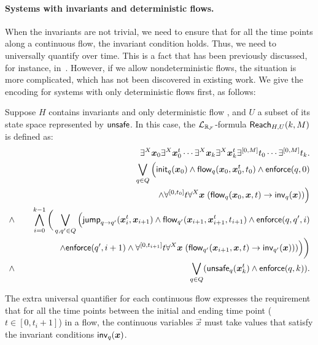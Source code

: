 \documentclass[10pt,envcountsect]{llncs}
\newcommand{\enforce}{\mathsf{enforce}}
\begin{document}
\paragraph{Systems with invariants and deterministic flows.} When the invariants are not trivial, we need to ensure that for all the time points along a continuous flow, the invariant condition holds. Thus, we need to universally quantify over time. This is a fact that has been previously discussed, for instance, in~\cite{DBLP:conf/fmcad/CimattiMT12}. However, if we allow nondeterministic flows, the situation is more complicated, which has not been discovered in existing work. We give the encoding for systems with only deterministic flows first, as follows:
\begin{definition}\label{br2}
Suppose $H$ contains invariants and only deterministic flow
, and $U$ a subset of its state space represented by $\mathsf{unsafe}$. In this case, the $\mathcal{L}_{\mathbb{R}_{\mathcal{F}}}$-formula $\mathsf{Reach}_{H,U}(k,M)$ is defined as:
\begin{eqnarray*}
& &\exists^X \vec x_{0} \exists^X\vec x_{0}^t\cdots \exists^X \vec x_{k}\exists^X\vec x_{k}^t \exists^{[0,M]}t_0\cdots \exists^{[0,M]}t_k.\\
& &\bigvee_{q\in Q} \Big(\init_{q}(\vec x_{0})\wedge \flow_{q}(\vec x_{0}, \vec x_{0}^t, t_0)\wedge \enforce(q,0)\\
& &\hspace{5cm} \wedge \forall^{[0,t_0]}t\forall^X\vec x\;(\flow_{q}(\vec x_{0}, \vec x, t)\rightarrow \inv_{q}(\vec x))\Big) \\
\wedge & &\bigwedge_{i=0}^{k-1}\bigg( \bigvee_{q, q'\in Q} \Big(\jump_{q\rightarrow q'}(\vec
x_{i}^t, \vec x_{i+1})\wedge \flow_{q'}(\vec x_{i+1}, \vec x_{i+1}^t, t_{i+1})\wedge \enforce(q,q',i)\\
& & \hspace{1.5cm}\wedge\enforce(q',i+1)\wedge \forall^{[0,t_{i+1}]}t\forall^X\vec x\;(\flow_{q'}(\vec x_{i+1}, \vec x,
t)\rightarrow \inv_{q'}(\vec x)) )\Big)\bigg)\\
\wedge & &\bigvee_{q\in Q} (\unsafe_q(\vec x_{k}^t)\wedge \enforce(q,k)).
\end{eqnarray*}
\end{definition}
The extra universal quantifier for each continuous flow expresses the requirement that for all the time points between the initial and ending time point ($t\in[0,t_i+1]$) in a flow, the continuous variables $\vec x$ must take values that satisfy the invariant conditions $\inv_q(\vec x)$.
\end{document}
